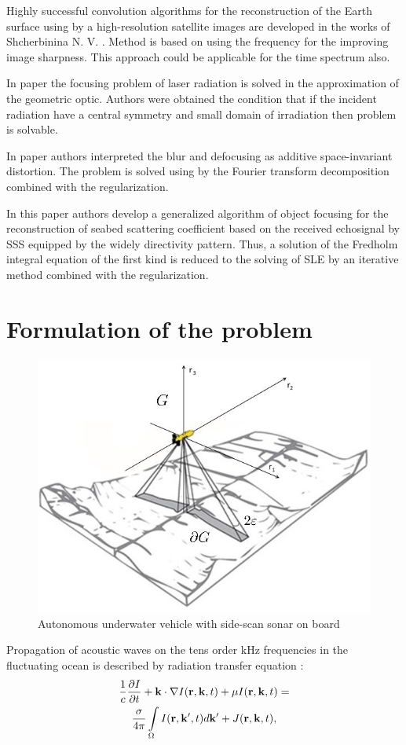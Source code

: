 \documentclass{procDDs}
\begin{document}
Highly successful convolution algorithms for the reconstruction of  the Earth surface  using by a high-resolution satellite images are developed in the works of Shcherbinina N. V. \cite{Shcherbinina}. Method is based on using the frequency for the improving image sharpness. This approach could be applicable for the time spectrum also.

In paper \cite{p2} the focusing problem of laser radiation is solved in the approximation of the geometric optic. Authors were obtained the condition that if the incident radiation have a central symmetry and small domain of irradiation then problem is solvable.

In paper \cite{p3} authors interpreted the blur and defocusing as additive space-invariant distortion. The problem is solved using by the Fourier transform decomposition combined with the regularization.

In this paper authors develop a generalized algorithm of object focusing for the reconstruction of seabed scattering coefficient based on the received echosignal by SSS equipped by the widely directivity pattern. Thus, a solution of the Fredholm integral equation of the first kind is reduced to the solving of SLE by an iterative method combined with the regularization.

\section{Formulation of the problem}
\begin{figure}[h!]\center
	
	\includegraphics[width=1\linewidth]{img/gbo.jpg}
	\caption{Autonomous underwater vehicle with side-scan sonar on board}
	\label{ris:gbo}
\end{figure}
Propagation of acoustic waves on the tens order kHz frequencies in the fluctuating ocean is described by radiation
transfer equation \cite{AF2015, SPIE_KOV,SMJ2015}:
\begin{multline}
	\label{model}
	\frac{1}{c} \frac{\partial I}{\partial t} + \mathbf{k} \cdot \nabla I(\mathbf{r},\mathbf{k},t) + \mu I(\mathbf{r},\mathbf{k},t) = \\
	\frac{\sigma}{4 \pi} \int\limits_{\Omega} I(\mathbf{r},\mathbf{k}',t) d\mathbf{k}' + J(\mathbf{r},\mathbf{k},t),
\end{multline}
\end{document}
